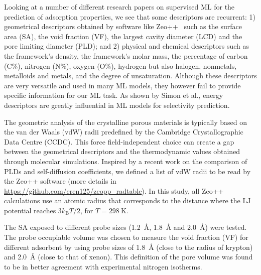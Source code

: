 \documentclass[main]{subfiles}
\begin{document}
Looking at a number of different research papers on supervised ML for the prediction of adsorption properties,\cite{Fernandez_2013,Simon_2015,Fanourgakis_2020,Anderson_2020,Pardakhti_2020} we see that some descriptors are recurrent: 1) geometrical descriptors obtained by software like Zeo++~\cite{zeopp_Willems2012} such as the surface area (SA), the void fraction (VF), the largest cavity diameter (LCD) and the pore limiting diameter (PLD); and 2) physical and chemical descriptors such as the framework's density, the framework's molar mass, the percentage of carbon (C\%), nitrogen (N\%), oxygen (O\%), hydrogen but also halogen, nonmetals, metalloids and metals, and the degree of unsaturation. Although these descriptors are very versatile and used in many ML models, they however fail to provide specific information for our ML task. As shown by Simon et al., energy descriptors are greatly influential in ML models for selectivity prediction.

The geometric analysis of the crystalline porous materials is typically based on the van der Waals (vdW) radii predefined by the Cambridge Crystallographic Data Centre (CCDC). This force field-independent choice can create a gap between the geometrical descriptors and the thermodynamic values obtained through molecular simulations. Inspired by a recent work on the comparison of PLDs and self-diffusion coefficients,\cite{Hung_2021} we defined a list of vdW radii to be read by the Zeo++ software (more details in \url{https://github.com/eren125/zeopp_radtable}). In this study, all Zeo++ calculations use an atomic radius that corresponds to the distance where the LJ potential reaches $3 k_\text{B} T/2$, for $T = \SI{298}{\kelvin}$.

The SA exposed to different probe sizes (\SI{1.2}{\angstrom}, \SI{1.8}{\angstrom} and \SI{2.0}{\angstrom}) were tested. The probe occupiable volume was chosen to measure the void fraction (VF) for different adsorbent by using probe sizes of \SI{1.8}{\angstrom} (close to the radius of krypton) and \SI{2.0}{\angstrom} (close to that of xenon). This definition of the pore volume was found to be in better agreement with experimental nitrogen isotherms.\cite{vol_Ongari2017}
\end{document}
